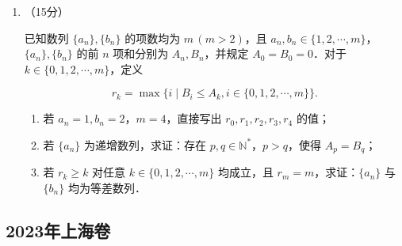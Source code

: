 \begin{description}
\begin{enumerate}[leftmargin=5pt]
        \item （15分）

        已知数列 $\{a_n\},\{b_n\}$ 的项数均为 $m\,(m>2)$，且 $a_n,b_n\in\{1,2,\cdots,m\}$，$\{a_n\},\{b_n\}$ 的前 $n$ 项和分别为 $A_n,B_n$，并规定 $A_0=B_0=0$．对于 $k\in\{0,1,2,\cdots,m\}$，定义

        \[
        r_k=\max\{i\mid B_i\leqslant A_k,i\in\{0,1,2,\cdots,m\}\}.
        \]

        \begin{enumerate}[label=(\arabic*)]
            \item 若 $a_n=1,b_n=2$，$m=4$，直接写出 $r_0,r_1,r_2,r_3,r_4$ 的值；
            \item 若 $\{a_n\}$ 为递增数列，求证：存在 $p,q\in\mathbb{N}^*$，$p>q$，使得 $A_p=B_q$；
            \item 若 $r_k\geqslant k$ 对任意 $k\in\{0,1,2,\cdots,m\}$ 均成立，且 $r_m=m$，求证：$\{a_n\}$ 与 $\{b_n\}$ 均为等差数列．
        \end{enumerate}
    \end{enumerate}
\end{description}
\clearpage


\subsection{2023年上海卷}\label{gk:2023年上海卷}

